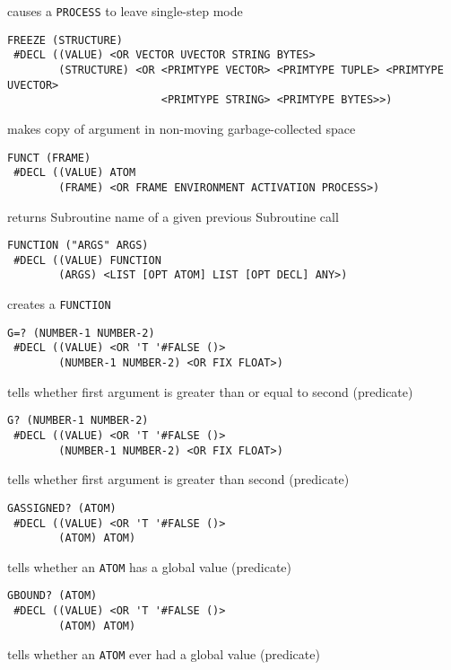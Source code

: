 \documentclass[a4paper,]{article}
\begin{document}
causes a \texttt{PROCESS} to leave single-step mode

\begin{verbatim}
FREEZE (STRUCTURE)
 #DECL ((VALUE) <OR VECTOR UVECTOR STRING BYTES>
        (STRUCTURE) <OR <PRIMTYPE VECTOR> <PRIMTYPE TUPLE> <PRIMTYPE UVECTOR>
                        <PRIMTYPE STRING> <PRIMTYPE BYTES>>)
\end{verbatim}

makes copy of argument in non-moving garbage-collected space

\begin{verbatim}
FUNCT (FRAME)
 #DECL ((VALUE) ATOM
        (FRAME) <OR FRAME ENVIRONMENT ACTIVATION PROCESS>)
\end{verbatim}

returns Subroutine name of a given previous Subroutine call

\begin{verbatim}
FUNCTION ("ARGS" ARGS)
 #DECL ((VALUE) FUNCTION
        (ARGS) <LIST [OPT ATOM] LIST [OPT DECL] ANY>)
\end{verbatim}

creates a \texttt{FUNCTION}

\begin{verbatim}
G=? (NUMBER-1 NUMBER-2)
 #DECL ((VALUE) <OR 'T '#FALSE ()>
        (NUMBER-1 NUMBER-2) <OR FIX FLOAT>)
\end{verbatim}

tells whether first argument is greater than or equal to second (predicate)

\begin{verbatim}
G? (NUMBER-1 NUMBER-2)
 #DECL ((VALUE) <OR 'T '#FALSE ()>
        (NUMBER-1 NUMBER-2) <OR FIX FLOAT>)
\end{verbatim}

tells whether first argument is greater than second (predicate)

\begin{verbatim}
GASSIGNED? (ATOM)
 #DECL ((VALUE) <OR 'T '#FALSE ()>
        (ATOM) ATOM)
\end{verbatim}

tells whether an \texttt{ATOM} has a global value (predicate)

\begin{verbatim}
GBOUND? (ATOM)
 #DECL ((VALUE) <OR 'T '#FALSE ()>
        (ATOM) ATOM)
\end{verbatim}

tells whether an \texttt{ATOM} ever had a global value (predicate)
\end{document}
